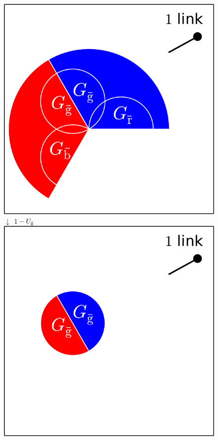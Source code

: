 \documentclass[aps, pre, onecolumn, a4paper, floatfix]{revtex4}
\begin{document}
\begin{figure}[htb]
\begin{minipage}[b]{0.22\linewidth}
\begin{center}
    \includegraphics[width=0.99\columnwidth]{sets_1_no_2_gc.pdf}\\
     \vspace{3mm}
    {\large $\downarrow$} $1-U_{\bar{\rm g}}$\\
     \vspace{3mm}
    \includegraphics[width=0.99\columnwidth]{sets_1_gc_no_2.pdf}\\

\end{center}
\end{minipage}
\end{figure}
\end{document}
